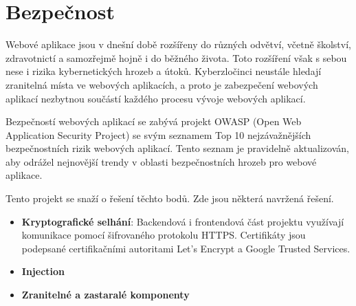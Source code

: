 \chapter{Bezpečnost}
Webové aplikace jsou v dnešní době rozšířeny do různých odvětví, včetně školství, zdravotnictí a samozřejmě hojně i do běžného života. Toto rozšíření však s sebou nese i rizika kybernetických hrozeb a útoků. Kyberzločinci neustále hledají zranitelná místa ve webových aplikacích, a proto je zabezpečení webových aplikací nezbytnou součástí každého procesu vývoje webových aplikací. \par
Bezpečností webových aplikací se zabývá projekt OWASP \cite{owasp}(Open Web Application Security Project) se svým seznamem Top 10 nejzávažnějších \cite{owasp10} bezpečnostních rizik webových aplikací. Tento seznam je pravidelně aktualizován, aby odrážel nejnovější trendy v oblasti bezpečnostních hrozeb pro webové aplikace.\par
Tento projekt se snaží o řešení těchto bodů. Zde jsou některá navržená řešení.\par

\begin{itemize}
    \item \textbf{Kryptografické selhání}\cite{crypto}: Backendová i frontendová část projektu využívají komunikace pomocí šifrovaného protokolu HTTPS. Certifikáty jsou podepsané certifikačními autoritami Let's Encrypt a Google Trusted Services.
    \item \textbf{Injection}
    \item \textbf{Zranitelné a zastaralé komponenty}
\end{itemize}
\